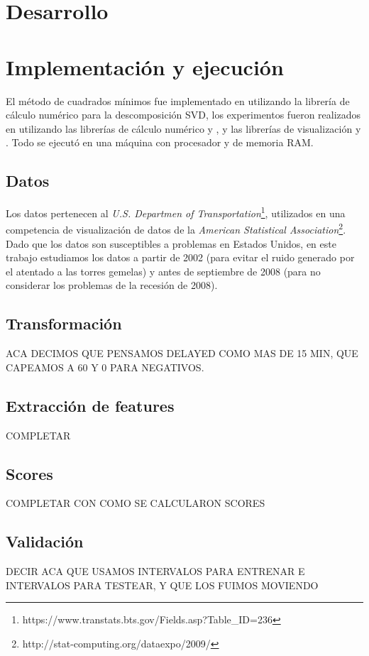 \section{Desarrollo}\label{sec:desarrollo}

\section{Implementaci\'on y ejecuci\'on}\label{sec:ejecucion}
El m\'etodo de cuadrados m\'inimos fue implementado en  utilizando
la librer\'ia de c\'alculo num\'erico  para la descomposici\'on SVD,
los experimentos fueron realizados en  utilizando las librer\'ias
de c\'alculo num\'erico  y , y
las librer\'ias de visualizaci\'on  y .
Todo se ejecut\'o en una m\'aquina con procesador 
y  de memoria RAM.

\subsection{Datos}\label{subsec:datos}
Los datos pertenecen al \textit{U.S. Departmen of
Transportation}\footnote{https://www.transtats.bts.gov/Fields.asp?Table\_ID=236},
utilizados en una competencia de visualizaci\'on
de datos de la \textit{American Statistical Association}\footnote{
http://stat-computing.org/dataexpo/2009/}.
Dado que los datos son susceptibles a problemas en Estados Unidos, en este trabajo
estudiamos los datos a partir de 2002 (para evitar el ruido generado por el atentado a las torres
gemelas) y antes de septiembre de 2008 (para no considerar los problemas de la recesi\'on de 2008).

\subsection{Transformaci\'on}\label{subsec:transformacion}
ACA DECIMOS QUE PENSAMOS DELAYED COMO MAS DE 15 MIN, QUE CAPEAMOS A 60 Y 0 PARA NEGATIVOS.

\subsection{Extracci\'on de features}\label{subsec:extraccion}
COMPLETAR

\subsection{Scores}\label{subsec:scores}
COMPLETAR CON COMO SE CALCULARON SCORES

\subsection{Validaci\'on}\label{subsec:validacion}
DECIR ACA QUE USAMOS INTERVALOS PARA ENTRENAR E INTERVALOS PARA TESTEAR, Y QUE LOS FUIMOS MOVIENDO